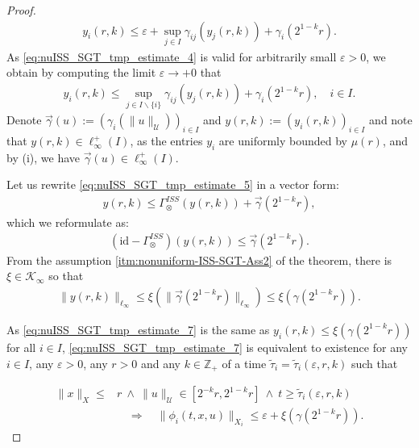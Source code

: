 \documentclass[twocolumn]{IEEEtran} %
\theoremstyle{definition}
\newcommand{\Uc}{\mathcal{U}}%
\newcommand{\Kinf}{\mathcal{K_\infty}}%
\newcommand{\ep}{\varepsilon}%
\newcommand{\Z}{\mathbb{Z}}%
\newcommand \qrq   {\quad\Rightarrow\quad}
\begin{document}
\begin{proof}
\begin{eqnarray}
\label{eq:nuISS_SGT_tmp_estimate_4}
  y_i(r,k) \leq \ep + \sup_{j\in I}\gamma_{ij}\left(y_j(r,k)\right) + \gamma_i(2^{1-k}r).%
\end{eqnarray}
As \eqref{eq:nuISS_SGT_tmp_estimate_4} is valid for arbitrarily small $\ep>0$, we obtain by computing the limit $\ep\to +0$ that%
\begin{eqnarray}\label{eq:nuISS_SGT_tmp_estimate_5}
  y_i(r,k) \leq \sup_{j\in I\backslash\{i\}}\gamma_{ij}\left(y_j(r,k)\right) + \gamma_i(2^{1-k}r),\quad i\in I.%
\end{eqnarray}
Denote $\vec{\gamma}(u) := ( \gamma_i(\|u\|_{\Uc}) )_{i \in I}$ and $y(r,k):=(y_i(r,k))_{i\in I}$ and note that $y(r,k)  \in\ell_\infty^+(I)$, as the entries $y_i$ are uniformly bounded by $\mu(r)$, and by (i), we have $\vec{\gamma}(u) \in \ell_\infty^+(I)$.

Let us rewrite \eqref{eq:nuISS_SGT_tmp_estimate_5} in a vector form:%
\begin{eqnarray}\label{eq:nuISS_SGT_tmp_estimate_6}
  y(r,k) \leq \Gamma^{ISS}_\otimes\left(y(r,k)\right) + \vec{\gamma}(2^{1-k}r),%
\end{eqnarray}
which we reformulate as:%
\begin{eqnarray*}
  (\mathrm{id}-\Gamma^{ISS}_\otimes)(y(r,k)) \leq \vec{\gamma}(2^{1-k}r).
\end{eqnarray*}
From the assumption \ref{itm:nonuniform-ISS-SGT-Ass2} of the theorem, there is $\xi\in\Kinf$ so that%
\begin{eqnarray}
  \|y(r,k)\|_{\ell_\infty} \leq \xi(\| \vec{\gamma}(2^{1-k}r)\|_{\ell_\infty}) \leq \xi(\gamma(2^{1-k}r)).%
\label{eq:nuISS_SGT_tmp_estimate_7}
\end{eqnarray}

As \eqref{eq:nuISS_SGT_tmp_estimate_7} is the same as $y_i(r,k) \leq \xi(\gamma(2^{1-k}r))$ for all $i\in I$, \eqref{eq:nuISS_SGT_tmp_estimate_7} is equivalent to
existence for any $i\in I$, any $\ep>0$, any $r>0$ and any $k\in \Z_+$ of a time $\tilde{\tau}_i=\tilde{\tau}_i(\ep,r,k)$ such that

\begin{equation} 
\label{eq:nuISS_SGT_intermediate_step}
\begin{split}
\|x\|_X\leq &r\ \wedge \ \|u\|_\Uc \in [2^{-k}r,2^{1-k}r] \ \wedge \ t\geq\tilde{\tau}_i(\ep,r,k)\\
& \qrq \|\phi_i(t, x, u)\|_{X_i}  \leq \ep + \xi(\gamma(2^{1-k}r)).
\end{split}
\end{equation}
%


\end{proof}
\end{document}
